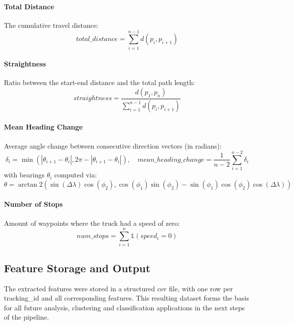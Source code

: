 \documentclass[a4paper,12pt,twoside]{scrreprt}
\begin{document}
\paragraph{Total Distance}
The cumulative travel distance:
\[
  total\_distance = \sum_{i=1}^{n-1} d(p_i, p_{i+1})
\]

\paragraph{Straightness}
Ratio between the start-end distance and the total path length:
\[
  straightness = \frac{d(p_1, p_n)}{\sum_{i=1}^{n-1} d(p_i, p_{i+1})}
\]

\paragraph{Mean Heading Change}
Average angle change between consecutive direction vectors (in radians):
\[
  \delta_i = \min(|\theta_{i+1} - \theta_i|, 2\pi - |\theta_{i+1} - \theta_i|),
  \quad
  mean\_heading\_change = \frac{1}{n-2} \sum_{i=1}^{n-2} \delta_i
\]
with bearings $\theta_i$ computed via:
\[
  \theta = \arctan2\left( \sin(\Delta \lambda) \cos(\phi_2),
  \cos(\phi_1)\sin(\phi_2) - \sin(\phi_1)\cos(\phi_2)\cos(\Delta \lambda)
  \right)
\]

\paragraph{Number of Stops}
Amount of waypoints where the truck had a speed of zero:
\[
  num\_stops = \sum_{i=1}^{n} \mathbb{1}(speed_i = 0)
\]

\subsection{Feature Storage and Output}

The extracted features were stored in a structured csv file, with one row per
tracking\_id and all corresponding features. This resulting dataset forms the
basis for all future analysis, clustering and classification applications in
the next steps of the pipeline.
\end{document}

